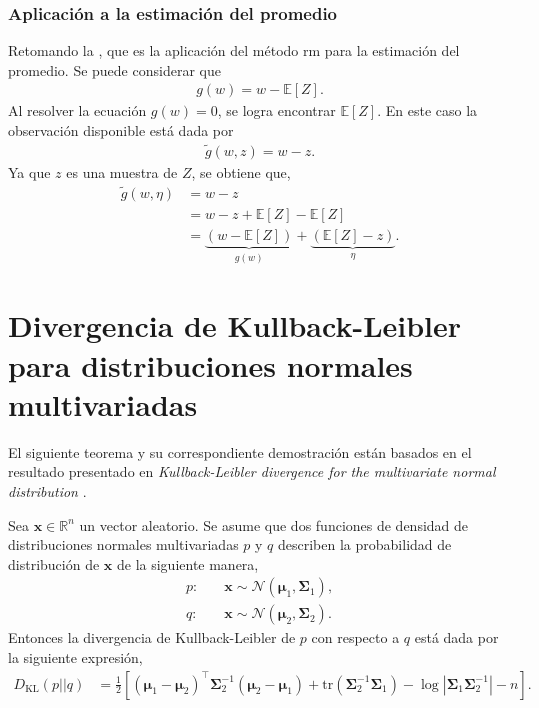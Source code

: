 \subsubsection{Aplicación a la estimación del promedio}
Retomando la , que es la aplicación del método \acrshort{rm} para la estimación del promedio. Se puede considerar que 
\begin{align}
    g(w) = w - \mathbb{E}[Z].
\end{align}
Al resolver la ecuación $g(w)=0$, se logra encontrar $\mathbb{E}[Z]$. En este caso la observación disponible está dada por 
\begin{align}
    \tilde{g}(w, z) = w-z.
\end{align}
Ya que $z$ es una muestra de $Z$, se obtiene que,
\begin{equation}
    \begin{aligned}
    \tilde{g}(w, \eta) &= w-z \\
    &= w - z + \mathbb{E}[Z] - \mathbb{E}[Z] \\
    &= \underbrace{(w - \mathbb{E}[Z])}_{g(w)} + \underbrace{(\mathbb{E}[Z]-z)}_{\eta}.
    \end{aligned}
\end{equation}



\section{Divergencia de Kullback-Leibler para distribuciones normales multivariadas}

El siguiente teorema y su correspondiente demostración están basados en el resultado presentado en \textit{Kullback-Leibler divergence for the multivariate normal distribution} \cite{soch2023}.

\begin{theorem}
    Sea $\mathbf{x} \in \mathbb{R}^{n}$ un vector aleatorio. Se asume que dos funciones de densidad de distribuciones normales multivariadas $p$ y $q$ describen la probabilidad de distribución de $\mathbf{x}$ de la siguiente manera,
    \begin{align}
        p: & \quad \mathbf{x} \sim \mathcal{N}(\bm{\mu}_1, \bm{\Sigma}_1), \\
        q: & \quad \mathbf{x} \sim \mathcal{N}(\bm{\mu}_2, \bm{\Sigma}_2).
    \end{align}
    Entonces la divergencia de Kullback-Leibler de $p$ con respecto a $q$ está dada por la siguiente expresión,
    \begin{align}
    D_{\text{KL}}(p||q) &= \frac{1}{2}\left[ 
    (\bm{\mu}_1 - \bm{\mu}_2)^{\top}\bm{\Sigma}_2^{-1}(\bm{\mu}_2-\bm{\mu}_1)
    +\text{tr} \left(\bm{\Sigma}_2^{-1}\bm{\Sigma}_1\right)
    - \log|\bm{\Sigma}_1 \bm{\Sigma}_2^{-1}|-n\right].
    \label{KL_normal}
    \end{align}
\end{theorem}

